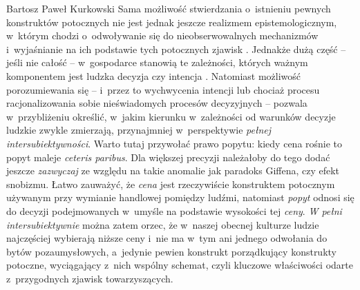 \begin{artplenv}{Bartosz Paweł Kurkowski}
Sama możliwość stwierdzania o~istnieniu pewnych konstruktów potocznych nie jest jednak jeszcze realizmem
epistemologicznym, w~którym chodzi o~odwoływanie się do nieobserwowalnych mechanizmów i~wyjaśnianie na ich podstawie
tych potocznych zjawisk
\parencite[s.~261]{gorazda_filozofia_2014}.
Jednakże dużą
część -- jeśli nie całość -- w~gospodarce stanowią te zależności, których ważnym komponentem jest ludzka decyzja czy intencja
\parencite[s.~214]{gorazda_filozofia_2014}.
Natomiast możliwość porozumiewania się -- i~przez to wychwycenia
intencji lub chociaż procesu racjonalizowania sobie nieświadomych procesów decyzyjnych -- pozwala w~przybliżeniu
określić, w~jakim kierunku w~zależności od warunków decyzje ludzkie zwykle zmierzają, przynajmniej w~perspektywie
\textit{pełnej intersubiektywności}. Warto tutaj przywołać prawo popytu: kiedy cena rośnie to popyt maleje
\textit{ceteris paribus}. Dla większej precyzji należałoby do tego dodać jeszcze \textit{zazwyczaj} ze względu na takie
anomalie jak paradoks Giffena, czy efekt snobizmu. Łatwo zauważyć, że \textit{cena} jest rzeczywiście konstruktem
potocznym używanym przy wymianie handlowej pomiędzy ludźmi, natomiast \textit{popyt }odnosi się do decyzji
podejmowanych w~umyśle na podstawie wysokości tej \textit{ceny}. \textit{W pełni intersubiektywnie }można zatem orzec,
że w~naszej obecnej kulturze ludzie najczęściej wybierają niższe ceny i~nie ma w~tym ani jednego odwołania do bytów
pozaumysłowych, a~jedynie pewien konstrukt porządkujący konstrukty potoczne, wyciągający z~nich wspólny schemat, czyli
kluczowe właściwości odarte z~przygodnych zjawisk towarzyszących.



\end{artplenv}

